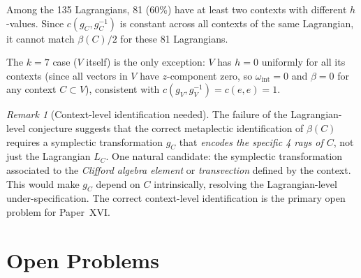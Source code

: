 \documentclass[11pt,a4paper]{article}
\theoremstyle{remark}
\newtheorem{remark}[theorem]{Remark}
\begin{document}
\noindent
Among the 135 Lagrangians, 81 (60\%) have at least two contexts with different
$h$-values.
Since $c(g_C, g_C^{-1})$ is constant across all contexts of the same Lagrangian,
it cannot match $\beta(C)/2$ for these 81 Lagrangians.

The $k=7$ case ($V$ itself) is the only exception: $V$ has $h = 0$ uniformly
for all its contexts (since all vectors in $V$ have $z$-component zero, so
$\omega_{\mathrm{int}} = 0$ and $\beta = 0$ for any context $C \subset V$),
consistent with $c(g_V, g_V^{-1}) = c(e, e) = 1$.

\begin{remark}[Context-level identification needed]
The failure of the Lagrangian-level conjecture suggests that the correct
metaplectic identification of $\beta(C)$ requires a symplectic transformation
$g_C$ that \emph{encodes the specific 4 rays of $C$}, not just the Lagrangian
$L_C$.
One natural candidate: the symplectic transformation associated to the
\emph{Clifford algebra element} or \emph{transvection} defined by the context.
This would make $g_C$ depend on $C$ intrinsically, resolving the
Lagrangian-level under-specification.
The correct context-level identification is the primary open problem for
Paper~XVI.
\end{remark}


\section{Open Problems}\label{sec:open}
\end{document}
